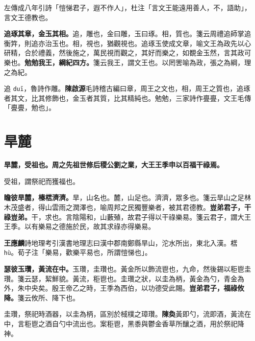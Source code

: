 \begin{quoting}左傳成八年引詩「愷悌君子，遐不作人」，杜注「言文王能遠用善人，不，語助」，言文王德教也。\end{quoting}

\textbf{追琢其章，金玉其相。}{\footnotesize 追，雕也，金曰雕，玉曰琢。相，質也。箋云周禮追師掌追衡筓，則追亦治玉也。相，視也，猶觀視也。追琢玉使成文章，喻文王為政先以心研精，合於禮義，然後施之，萬民視而觀之，其好而樂之，如覩金玉然，言其政可樂也。}\textbf{勉勉我王，綱紀四方。}{\footnotesize 箋云我王，謂文王也。以罔罟喻為政，張之為綱，理之為紀。}

\begin{quoting}追 \texttt{duī}，魯詩作雕。\textbf{陳啟源}毛詩稽古編曰章，周王之文也，相，周王之質也，追琢者其文，比其修飾也，金玉者其質，比其精純也。勉勉，三家詩作亹亹，文王毛傳「亹亹，勉也」。\end{quoting}

\section{旱麓}


\textbf{旱麓，受祖也。周之先祖世修后稷公劉之業，大王王季申以百福干祿焉。}

\begin{quoting}受祖，謂祭祀而獲福也。\end{quoting}

\textbf{瞻彼旱麓，榛楛濟濟。}{\footnotesize 旱，山名也。麓，山足也。濟濟，眾多也。箋云旱山之足林木茂盛者，得山雲雨之潤澤也，喻周邦之民獨豐樂者，被其君德教。}\textbf{豈弟君子，干祿豈弟。}{\footnotesize 干，求也。言陰陽和，山藪殖，故君子得以干祿樂易。箋云君子，謂大王王季。以有樂易之德施於民，故其求祿亦得樂易。}

\begin{quoting}\textbf{王應麟}詩地理考引漢書地理志曰漢中郡南鄭縣旱山，沱水所出，東北入漢。楛 \texttt{hù}。荀子注「樂易，歡樂平易也，所謂愷悌也」。\end{quoting}

\textbf{瑟彼玉瓚，黃流在中。}{\footnotesize 玉瓚，圭瓚也。黃金所以飾流鬯也，九命，然後錫以秬鬯圭瓚。箋云瑟，絜鮮貌。黃流，秬鬯也。圭瓚之狀，以圭為柄，黃金為勺，青金為外，朱中央矣。殷王帝乙之時，王季為西伯，以功德受此賜。}\textbf{豈弟君子，福祿攸降。}{\footnotesize 箋云攸所、降下也。}

\begin{quoting}圭瓚，祭祀時酒器，以圭為柄，區別於棫樸之璋瓚。\textbf{陳奐}黃即勺，流即酒，黃流在中，言秬鬯之酒自勺中流出也。案秬鬯，黑黍與鬱金香草所釀之酒，用於祭祀降神。\end{quoting}

